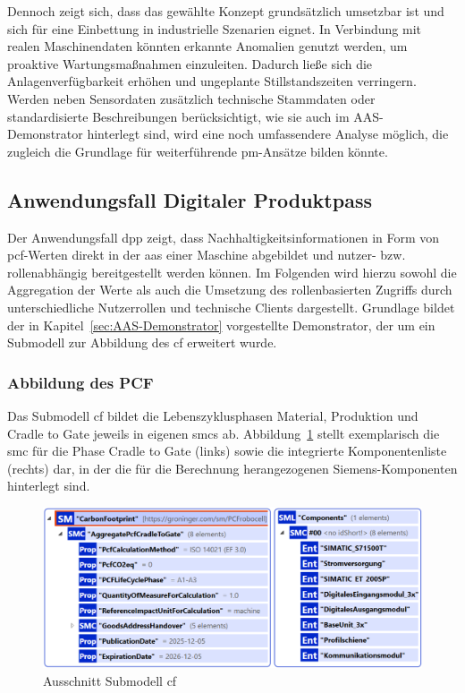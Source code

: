 Dennoch zeigt sich, dass das gewählte Konzept grundsätzlich umsetzbar ist und sich für eine Einbettung in industrielle Szenarien eignet. 
In Verbindung mit realen Maschinendaten könnten erkannte Anomalien genutzt werden, um proaktive Wartungsmaßnahmen einzuleiten. 
Dadurch ließe sich die Anlagenverfügbarkeit erhöhen und ungeplante Stillstandszeiten verringern.
Werden neben Sensordaten zusätzlich technische Stammdaten oder standardisierte Beschreibungen berücksichtigt, wie sie auch im AAS-Demonstrator hinterlegt sind, wird eine noch umfassendere Analyse möglich, die zugleich die Grundlage für weiterführende \acs{pm}-Ansätze bilden könnte.

\newpage
\subsection{Anwendungsfall Digitaler Produktpass}

Der Anwendungsfall \acs{dpp} zeigt, dass Nachhaltigkeitsinformationen in Form von \acs{pcf}-Werten direkt in der \acs{aas} einer Maschine abgebildet und nutzer- bzw. rollenabhängig bereitgestellt werden können.
Im Folgenden wird hierzu sowohl die Aggregation der Werte als auch die Umsetzung des rollenbasierten Zugriffs durch unterschiedliche Nutzerrollen und technische Clients dargestellt.
Grundlage bildet der in Kapitel~\ref{sec:AAS-Demonstrator} vorgestellte Demonstrator, der um ein Submodell zur Abbildung des \acs{cf} erweitert wurde.

\subsubsection{Abbildung des PCF}
Das Submodell \acs{cf} bildet die Lebenszyklusphasen Material, Produktion und Cradle to Gate jeweils in eigenen \acsp{smc} ab.
Abbildung~\ref{fig:SubmodellCF} stellt exemplarisch die \acs{smc} für die Phase Cradle to Gate (links) sowie die integrierte Komponentenliste (rechts) dar, in der die für die Berechnung herangezogenen Siemens-Komponenten hinterlegt sind.

\vspace{0.5em}
\begin{figure}[htbp]
    \centering
        \includegraphics[width=1\textwidth]{Bilder/ErgebnissePackageExplorer/CarbonFoorprintTest.png}
    \caption{Ausschnitt Submodell \acs{cf}}
    \label{fig:SubmodellCF}
\end{figure}
\vspace{-0.2em}

